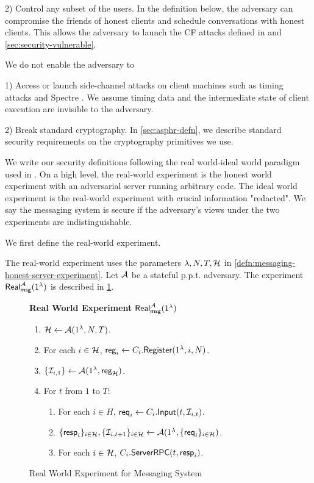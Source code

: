 2) Control any subset of the users. In the definition below, the adversary can compromise the friends of honest clients and schedule conversations with honest clients. This allows the adversary to launch the CF attacks defined in \cite{angel2018cf} and \cref{sec:security-vulnerable}.

We do not enable the adversary to

1) Access or launch side-channel attacks on client machines such as timing attacks and Spectre \cite{Spectre}. We assume timing data and the intermediate state of client execution are invisible to the adversary.

2) Break standard cryptography. In \cref{sec:asphr-defn}, we describe standard security requirements on the cryptography primitives we use.

We write our security definitions following the real world-ideal world paradigm used in \cite[Section 2.2]{shi2021non}. On a high level, the real-world experiment is the honest world experiment with an adversarial server running arbitrary code. The ideal world experiment is the real-world experiment with crucial information "redacted". We say the messaging system is secure if the adversary's views under the two experiments are indistinguishable.

We first define the real-world experiment.

\begin{definition}
\label{defn:messaging-real-world-experiment}
The real-world experiment uses the parameters $\lambda, N, T, \mathcal{H}$ in \cref{defn:messaging-honest-server-experiment}. Let $\mathcal{A}$ be a stateful p.p.t. adversary. The experiment $\mathsf{Real}_{\mathsf{msg}}^{\mathcal{A}}(1^{\lambda})$ is described in \cref{expr:messaging-real-world}.
\end{definition}

\begin{figure}[!ht]
\begin{framed}
\textbf{Real World Experiment }$\mathsf{Real}_{\mathsf{msg}}^{\mathcal{A}}(1^{\lambda})$
\begin{enumerate}
\item $\mathcal{H} \leftarrow \mathcal{A}(1^{\lambda}, N, T)$.
\item For each $i \in \mathcal{H}$, $\mathsf{reg}_i \leftarrow C_i.\mathsf{Register}(1^{\lambda}, i, N)$. 
\item $\{\mathcal{I}_{i, 1}\} \leftarrow \mathcal{A}(1^{\lambda}, \mathsf{reg}_{\mathcal{H}})$.
\item For $t$ from $1$ to $T$:
    \begin{enumerate}
    \item For each $i \in H$, $\mathsf{req}_i \leftarrow C_i.\mathsf{Input}(t, \mathcal{I}_{i, t})$.
    
    \item $\{\mathsf{resp}_i\}_{i \in \mathcal{H}}, \{\mathcal{I}_{i, t + 1}\}_{i \in \mathcal{H}} \leftarrow \mathcal{A}(1^{\lambda}, \{\mathsf{req}_i\}_{i \in \mathcal{H}})$.
    
    \item For each $i \in \mathcal{H}$, $C_i.\mathsf{ServerRPC}(t, \mathsf{resp}_i)$.
    \end{enumerate}
\end{enumerate}
\end{framed}
\caption{Real World Experiment for Messaging System}
\label{expr:messaging-real-world}
\end{figure}

